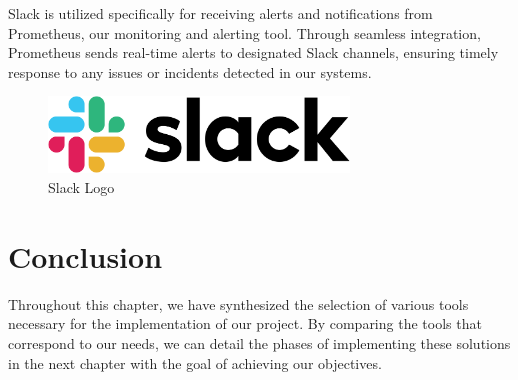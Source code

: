 Slack is utilized specifically for receiving alerts and notifications from Prometheus, our monitoring and alerting tool. Through seamless integration, Prometheus sends real-time alerts to designated Slack channels, ensuring timely response to any issues or incidents detected in our systems.
\begin{figure}[H]
\centering
\includegraphics[width=8cm]{Logos/slack_logo.png}
\caption[]{Slack Logo}
\end{figure}


\section{Conclusion}

Throughout this chapter, we have synthesized the selection of various tools necessary for the implementation of our project. By comparing the tools that correspond to our needs, we can detail the phases of implementing these solutions in the next chapter with the goal of achieving our objectives.

\pagebreak